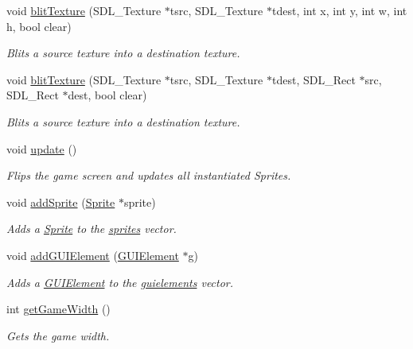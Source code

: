 \begin{DoxyCompactItemize}
void \hyperlink{class_graphics_a2b8441851d9c70e6ae7b3c103f46162d}{blit\-Texture} (S\-D\-L\-\_\-\-Texture $\ast$tsrc, S\-D\-L\-\_\-\-Texture $\ast$tdest, int x, int y, int w, int h, bool clear)
\begin{DoxyCompactList}\small\item\em Blits a source texture into a destination texture. \end{DoxyCompactList}\item 
void \hyperlink{class_graphics_ab3ba379c5c196820b59dcda8fda24db9}{blit\-Texture} (S\-D\-L\-\_\-\-Texture $\ast$tsrc, S\-D\-L\-\_\-\-Texture $\ast$tdest, S\-D\-L\-\_\-\-Rect $\ast$src, S\-D\-L\-\_\-\-Rect $\ast$dest, bool clear)
\begin{DoxyCompactList}\small\item\em Blits a source texture into a destination texture. \end{DoxyCompactList}\item 
void \hyperlink{class_graphics_a5a5297a160c22f73300dcf72ac0be7c2}{update} ()
\begin{DoxyCompactList}\small\item\em Flips the game screen and updates all instantiated Sprites. \end{DoxyCompactList}\item 
void \hyperlink{class_graphics_a398c8e6d13eda586fcfb50952ba25eac}{add\-Sprite} (\hyperlink{class_sprite}{Sprite} $\ast$sprite)
\begin{DoxyCompactList}\small\item\em Adds a \hyperlink{class_sprite}{Sprite} to the \hyperlink{class_graphics_ad01e5a24a1ce34c64f6dd7de4f85fc8b}{sprites} vector. \end{DoxyCompactList}\item 
void \hyperlink{class_graphics_ad06e41bffceda0186291e520fb37fa67}{add\-G\-U\-I\-Element} (\hyperlink{class_g_u_i_element}{G\-U\-I\-Element} $\ast$g)
\begin{DoxyCompactList}\small\item\em Adds a \hyperlink{class_g_u_i_element}{G\-U\-I\-Element} to the \hyperlink{class_graphics_ac4ea71ee39d3cbc7b3fc14bf89fa400f}{guielements} vector. \end{DoxyCompactList}\item 
int \hyperlink{class_graphics_a6364aacb31a2f59c0ad7b423d10a6e3a}{get\-Game\-Width} ()
\begin{DoxyCompactList}\small\item\em Gets the game width. \end{DoxyCompactList}\item 

\end{DoxyCompactItemize}
